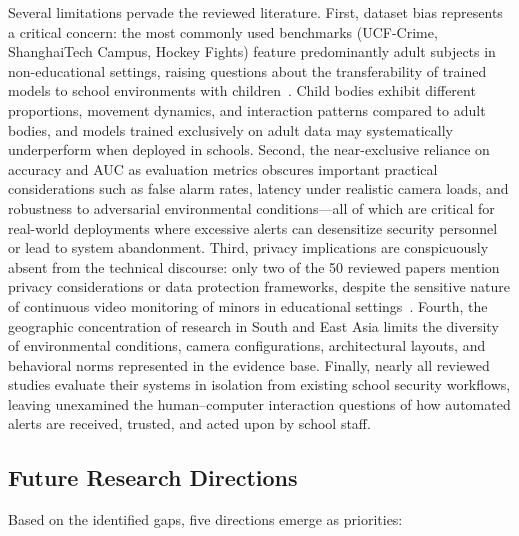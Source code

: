 \documentclass[conference]{IEEEtran}
\begin{document}
Several limitations pervade the reviewed literature. First, dataset bias represents a critical concern: the most commonly used benchmarks (UCF-Crime, ShanghaiTech Campus, Hockey Fights) feature predominantly adult subjects in non-educational settings, raising questions about the transferability of trained models to school environments with children~\cite{b15}. Child bodies exhibit different proportions, movement dynamics, and interaction patterns compared to adult bodies, and models trained exclusively on adult data may systematically underperform when deployed in schools. Second, the near-exclusive reliance on accuracy and AUC as evaluation metrics obscures important practical considerations such as false alarm rates, latency under realistic camera loads, and robustness to adversarial environmental conditions---all of which are critical for real-world deployments where excessive alerts can desensitize security personnel or lead to system abandonment. Third, privacy implications are conspicuously absent from the technical discourse: only two of the 50 reviewed papers mention privacy considerations or data protection frameworks, despite the sensitive nature of continuous video monitoring of minors in educational settings~\cite{b11}. Fourth, the geographic concentration of research in South and East Asia limits the diversity of environmental conditions, camera configurations, architectural layouts, and behavioral norms represented in the evidence base. Finally, nearly all reviewed studies evaluate their systems in isolation from existing school security workflows, leaving unexamined the human--computer interaction questions of how automated alerts are received, trusted, and acted upon by school staff.

\subsection{Future Research Directions}

Based on the identified gaps, five directions emerge as priorities:
\end{document}
